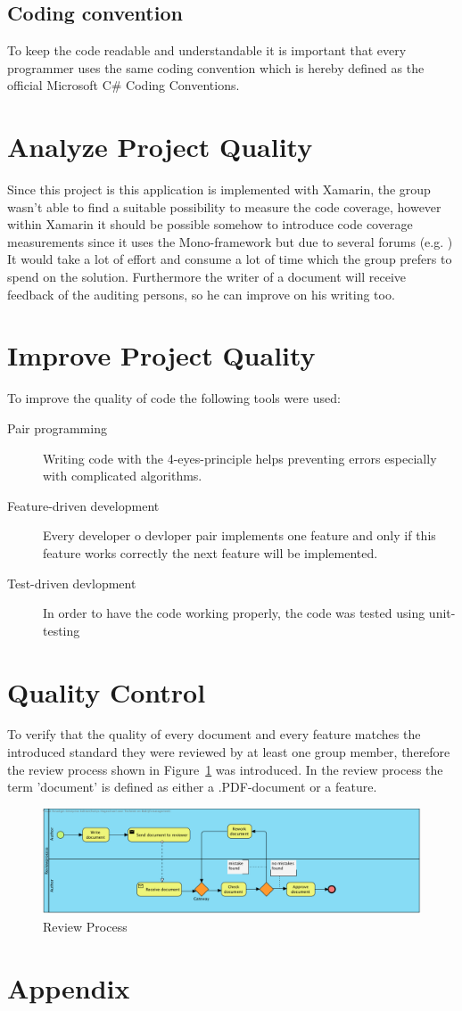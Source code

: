 \documentclass[12pt]{article}
\begin{document}
		\subsection{Coding convention}
		To keep the code readable and understandable it is important that every programmer uses the same coding convention which is hereby defined as the official Microsoft C\# Coding Conventions. \cite{Microsoft}
		
		\section{Analyze Project Quality}
		Since this project is this application is implemented with Xamarin, the group wasn't able to find a suitable possibility to measure the code coverage, however within Xamarin it should be possible somehow to introduce code coverage measurements since it uses the Mono-framework but due to several forums (e.g. \cite{CodeCoverage}) It would take a lot of effort and consume a lot of time which the group prefers to spend on the solution. Furthermore the writer of a document will receive feedback of the auditing persons, so he can improve on his writing too.
		\clearpage
		\section{Improve Project Quality}
		To improve the quality of code the following tools were used:
		\begin{description}
			\item[Pair programming] Writing code with the 4-eyes-principle helps preventing errors especially with complicated algorithms.
			\item[Feature-driven development] Every developer o devloper pair implements one feature and only if this feature works correctly the next feature will be implemented.
			\item[Test-driven devlopment] In order to have the code working properly, the code was tested using unit-testing
		\end{description}
		\clearpage
		\section{Quality Control}
		To verify that the quality of every document and every feature matches the introduced standard they were reviewed by at least one group member, therefore the review process shown in Figure~\ref{reviewProcess} was introduced. In the review process the term 'document' is defined as either a .PDF-document or a feature.
		\begin{figure}[htpb]
			\minipage{\textwidth}
			\includegraphics[width=\linewidth, keepaspectratio=true]{./img/CheckQuality.png}
			\caption{Review Process}\label{reviewProcess}
			\endminipage\hfill
		\end{figure}
		\clearpage

\clearpage
\section{Appendix}

\end{document}
